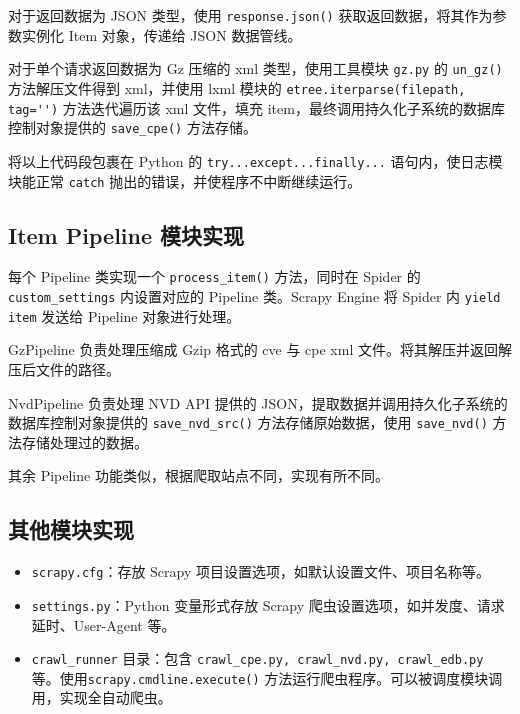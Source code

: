 \documentclass[a4paper,AutoFakeBold,oneside,12pt]{book}
\begin{document}
对于返回数据为 JSON 类型，使用 \lstinline[style = python]|response.json()| 获取返回数据，将其作为参数实例化 Item 对象，传递给 JSON 数据管线。

对于单个请求返回数据为 Gz 压缩的 xml 类型，使用工具模块 \lstinline[style = python]|gz.py| 的 \lstinline[style = python]|un_gz()| 方法解压文件得到 xml，并使用 lxml 模块的 \lstinline[style = python]|etree.iterparse(filepath, tag='')| 方法迭代遍历该 xml 文件，填充 item，最终调用持久化子系统的数据库控制对象提供的 \lstinline[style = python]|save_cpe()| 方法存储。

将以上代码段包裹在 Python 的 \lstinline|try...except...finally...| 语句内，使日志模块能正常 \lstinline|catch| 抛出的错误，并使程序不中断继续运行。

\subsection{Item Pipeline 模块实现}

每个 Pipeline 类实现一个 \lstinline[style = python]|process_item()| 方法，同时在 Spider 的 \lstinline[style = python]|custom_settings| 内设置对应的 Pipeline 类。Scrapy Engine 将 Spider 内 \lstinline[style = python]|yield item| 发送给 Pipeline 对象进行处理。

GzPipeline 负责处理压缩成 Gzip 格式的 cve 与 cpe xml 文件。将其解压并返回解压后文件的路径。

NvdPipeline 负责处理 NVD API 提供的 JSON，提取数据并调用持久化子系统的数据库控制对象提供的 \lstinline|save_nvd_src()| 方法存储原始数据，使用 \lstinline|save_nvd()| 方法存储处理过的数据。

其余 Pipeline 功能类似，根据爬取站点不同，实现有所不同。

\subsection{其他模块实现}

\begin{itemize}
	\item \lstinline|scrapy.cfg|：存放 Scrapy 项目设置选项，如默认设置文件、项目名称等。
	\item \lstinline|settings.py|：Python 变量形式存放 Scrapy 爬虫设置选项，如并发度、请求延时、User-Agent 等。
	\item \lstinline|crawl_runner| 目录：包含 \lstinline|crawl_cpe.py, crawl_nvd.py, crawl_edb.py| 等。使用\linebreak \lstinline|scrapy.cmdline.execute()| 方法运行爬虫程序。可以被调度模块调用，实现全自动爬虫。
\end{itemize}
\end{document}
